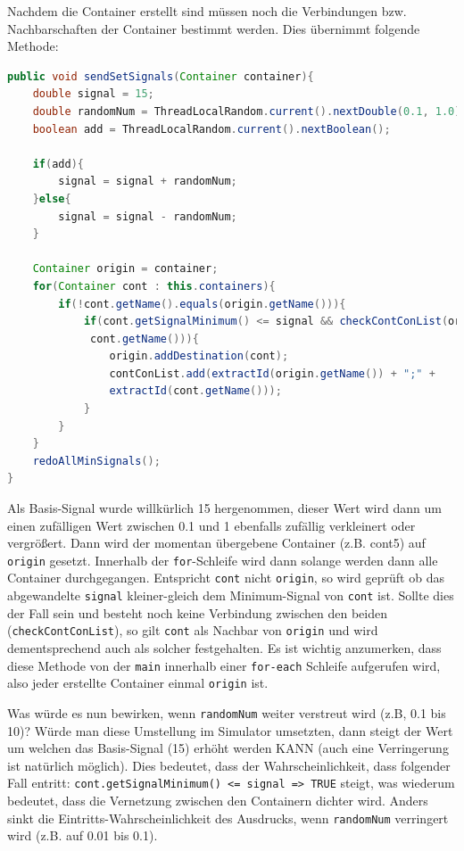 \documentclass[
    headings=optiontotocandhead,%
    twoside,
    numbers=noenddot,%
    12pt, %
    titlepage, %
    parskip=full, %
    listof=leveldown, 
    numbers=noenddot, %
    a4paper,DIV=14,
    BCOR=15mm,
]{scrbook}
\newcommand{\passthrough}[1]{#1}
\begin{document}
Nachdem die Container erstellt sind müssen noch die Verbindungen bzw.
Nachbarschaften der Container bestimmt werden. Dies übernimmt folgende
Methode:

\begin{lstlisting}[language=Java, caption={Methode welche die Verbindungen zwischen einzelnen Containern erstellt}]
public void sendSetSignals(Container container){
    double signal = 15;
    double randomNum = ThreadLocalRandom.current().nextDouble(0.1, 1.0);
    boolean add = ThreadLocalRandom.current().nextBoolean();
  
    if(add){
        signal = signal + randomNum;
    }else{
        signal = signal - randomNum;
    }
  
    Container origin = container;
    for(Container cont : this.containers){
        if(!cont.getName().equals(origin.getName())){
            if(cont.getSignalMinimum() <= signal && checkContConList(origin.getName(),
             cont.getName())){
                origin.addDestination(cont);
                contConList.add(extractId(origin.getName()) + ";" +
                extractId(cont.getName()));
            }
        }
    }
    redoAllMinSignals();
}
\end{lstlisting}

Als Basis-Signal wurde willkürlich 15 hergenommen, dieser Wert wird dann
um einen zufälligen Wert zwischen 0.1 und 1 ebenfalls zufällig
verkleinert oder vergrößert. Dann wird der momentan übergebene Container
(z.B. cont5) auf \passthrough{\lstinline!origin!} gesetzt. Innerhalb der
\passthrough{\lstinline!for!}-Schleife wird dann solange werden dann
alle Container durchgegangen. Entspricht \passthrough{\lstinline!cont!}
nicht \passthrough{\lstinline!origin!}, so wird geprüft ob das
abgewandelte \passthrough{\lstinline!signal!} kleiner-gleich dem
Minimum-Signal von \passthrough{\lstinline!cont!} ist. Sollte dies der
Fall sein und besteht noch keine Verbindung zwischen den beiden
(\passthrough{\lstinline!checkContConList!}), so gilt
\passthrough{\lstinline!cont!} als Nachbar von
\passthrough{\lstinline!origin!} und wird dementsprechend auch als
solcher festgehalten. Es ist wichtig anzumerken, dass diese Methode von
der \passthrough{\lstinline!main!} innerhalb einer
\passthrough{\lstinline!for-each!} Schleife aufgerufen wird, also jeder
erstellte Container einmal \passthrough{\lstinline!origin!} ist.

Was würde es nun bewirken, wenn \passthrough{\lstinline!randomNum!}
weiter verstreut wird (z.B, 0.1 bis 10)? Würde man diese Umstellung im
Simulator umsetzten, dann steigt der Wert um welchen das Basis-Signal
(15) erhöht werden KANN (auch eine Verringerung ist natürlich möglich).
Dies bedeutet, dass der Wahrscheinlichkeit, dass folgender Fall entritt:
\passthrough{\lstinline!cont.getSignalMinimum() <= signal => TRUE!}
steigt, was wiederum bedeutet, dass die Vernetzung zwischen den
Containern dichter wird. Anders sinkt die Eintritts-Wahrscheinlichkeit
des Ausdrucks, wenn \passthrough{\lstinline!randomNum!} verringert wird
(z.B. auf 0.01 bis 0.1).
\end{document}
